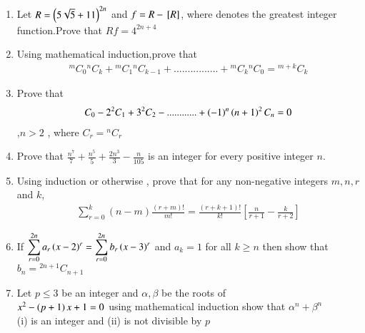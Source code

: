 \documentclass[journal,12pt,twocolumn]{IEEEtran}
\theoremstyle{remark}
\begin{document}
\begin{enumerate}
	    \item Let $ R =\left(5\sqrt{5}+11\right)^{2n} $ and $ f = R -{}\left[R\right] $, where \sbrak{} denotes the greatest integer function.Prove  that $ Rf =4^{2n+4 } $  \hfill {}


	    \item Using mathematical induction,prove that
		    \begin{align*} {}^mC_0{}^nC_k +{}^mC_1{}^nC_{k-1}+................+{}^mC_k{}^nC_0 ={}^{m+k}C_k \end{align*}  \hfill {}


	    \item Prove that \hfill{}
		    \begin{align*} 
		    C_0-2^2C_1+3^2C_2-............+\left(-1\right)^n\left(n+1\right)^2C_n =0
		    \end{align*},$n>2$ , where $C_r={}^nC_r$
		    

	    \item Prove that   $ \frac{n^7}{7}+\frac{n^5}{5}+\frac{2n^3}{3}-\frac{n}{105}$ is an integer for every positive integer $ n$. \hfill{}


	    \item Using induction or otherwise , prove that for any non-negative integers $m,n,r$ and $ k$,
		    \begin{align*} 
			    \sum_{r=0}^{k}(n-m)\frac{(r+m)!}{m!}= \frac{(r+k+1)!}{k!}[\frac{n}{r+1}-\frac{k}{r+2}]
		    \end{align*}
		     \hfill{} 

	    \item If $ \displaystyle\sum_{r=0}^{2n} a_r \left(x-2\right)^r=\displaystyle\sum_{r=0}^{2n}b_r \left(x-3\right)^r $ and $ a_k =1 $ for all $k \geq  n$ then show that $ b_n = {}^{2n+1}C_{n+1} $ \hfill {}

	    \item Let $ p \leq 3 $ be an integer and $ \alpha , \beta $ be  the roots of\\ $ x^2-\left(p+1\right)x+1=0 $ using mathematical induction show that $ \alpha^n  + \beta^n $\\ (i) is an integer and   
		        (ii) is not divisible by $ p $       \hfill{}
		    
 \end{enumerate}
    
    
\end{document}
